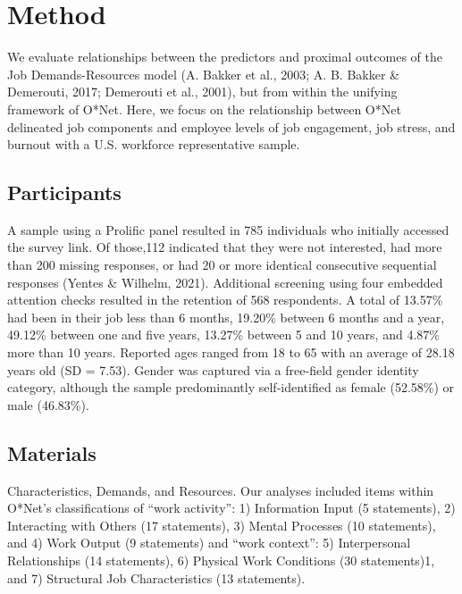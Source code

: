 \documentclass[
  man]{apa6}
\begin{document}
\hypertarget{method}{%
\section{Method}\label{method}}

We evaluate relationships between the predictors and proximal outcomes of the Job Demands-Resources model (A. Bakker et al., 2003; A. B. Bakker \& Demerouti, 2017; Demerouti et al., 2001), but from within the unifying framework of O*Net. Here, we focus on the relationship between O*Net delineated job components and employee levels of job engagement, job stress, and burnout with a U.S. workforce representative sample.

\hypertarget{participants}{%
\subsection{Participants}\label{participants}}

A sample using a Prolific panel resulted in 785 individuals who initially accessed the survey link. Of those,112 indicated that they were not interested, had more than 200 missing responses, or had 20 or more identical consecutive sequential responses (Yentes \& Wilhelm, 2021). Additional screening using four embedded attention checks resulted in the retention of 568 respondents. A total of 13.57\% had been in their job less than 6 months, 19.20\% between 6 months and a year, 49.12\% between one and five years, 13.27\% between 5 and 10 years, and 4.87\% more than 10 years. Reported ages ranged from 18 to 65 with an average of 28.18 years old (SD = 7.53). Gender was captured via a free-field gender identity category, although the sample predominantly self-identified as female (52.58\%) or male (46.83\%).

\hypertarget{materials}{%
\subsection{Materials}\label{materials}}

Characteristics, Demands, and Resources. Our analyses included items within O*Net's classifications of ``work activity'': 1) Information Input (5 statements), 2) Interacting with Others (17 statements), 3) Mental Processes (10 statements), and 4) Work Output (9 statements) and ``work context'': 5) Interpersonal Relationships (14 statements), 6) Physical Work Conditions (30 statements)1, and 7) Structural Job Characteristics (13 statements).
\end{document}
